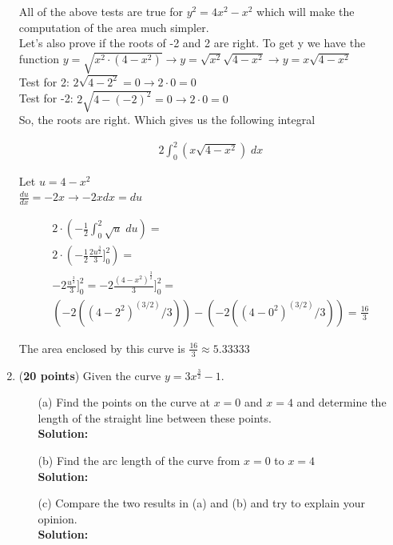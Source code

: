 \documentclass[a4paper]{article}
\begin{document}
\begin{enumerate}
All of the above tests are true for $y^2 = 4x^2 - x^2$ which will make the computation of the area much simpler.\\

Let's also prove if the roots of -2 and 2 are right. To get y we have the function $y = \sqrt{x^2 \cdot (4-x^2)} \rightarrow y = \sqrt{x^2} \sqrt{4-x^2} \rightarrow y = x \sqrt{4-x^2}$\\

Test for 2: $2 \sqrt{4 - 2^2} = 0 \rightarrow 2 \cdot 0 = 0$\\
Test for -2: $2 \sqrt{4 - (-2)^2} = 0 \rightarrow 2 \cdot 0 = 0$\\

So, the roots are right. Which gives us the following integral


\begin{align*}
	2 \int_0^2 (x \sqrt{4-x^2}) \; dx
\end{align*}

Let $u = 4 - x^2$\\
$\frac{du}{dx} = -2x \rightarrow -2xdx = du$

\begin{align*}
	2 \cdot ( - \frac{1}{2} \int_0^2 \sqrt{u}\; du ) =\\ 
	2 \cdot ( -\frac{1}{2} \frac{2u^\frac{3}{2}}{3} \Bigg]_0^2 ) =\\
	- 2 \frac{u^\frac{3}{2}}{3} \Bigg]_0^2 = - 2 \frac{(4-x^2)^\frac{3}{2}}{3} \Bigg]_0^2 = \\
	(-2 ((4-2^2)^(3/2)/3)) - (-2 ((4-0^2)^(3/2)/3)) =
	\frac{16}{3}
\end{align*}

The area enclosed by this curve is $\frac{16}{3} \approx 5.33333$	
	
	
	
	
\item (\textbf{20 points}) Given the curve $y = 3x^\frac{3}{2}-1$.


\begin{enumerate}
	\item[(a)] Find the points on the curve at $x = 0$ and $x = 4$ and determine the length of the straight line between these points.\\
	\textbf{Solution:}	
	
	\item[(b)] Find the arc length of the curve from $x = 0$ to $x = 4$\\
	\textbf{Solution:}	
	
	
	
	\item[(c)] Compare the two results in (a) and (b) and try to explain your opinion.\\
	\textbf{Solution:}	
	
	
\end{enumerate}

	
	
\end{enumerate}
\end{document}
